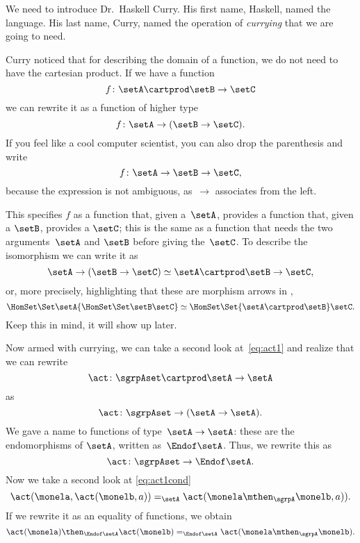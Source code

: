 We need to introduce Dr.~Haskell Curry. His first name,  Haskell, named the language.
 His last name, Curry, named the operation of \emph{currying} that we are going to need.

Curry noticed that for describing the domain of a function, we do not need to have the cartesian product.
If we have a function
\begin{equation}
f \colon \setA \cartprod \setB \to \setC
\end{equation}
we can rewrite it as a function of higher type
\begin{equation}
f \colon \setA \to ( \setB \to \setC).
\end{equation}
If you feel like a cool computer scientist, you can also drop the parenthesis and write
\begin{equation}
f \colon \setA \to \setB \to \setC,
\end{equation}
because the expression is not ambiguous, as~$\to$ associates from the left.



This specifies $f$ as a function that, given a~$\setA$, provides a function that, given a $\setB$,
provides a $\setC$; this is the same as a function that needs the two arguments~$\setA$ and $\setB$ before giving the~$\setC$.  To describe the isomorphism we can write it as 
\begin{equation}
  \setA \to ( \setB \to \setC) \simeq  \setA \cartprod \setB \to \setC,
\end{equation}
or, more precisely, highlighting that these are morphism arrows in \Set, 
\begin{equation}
  \HomSet\Set\setA{\HomSet\Set\setB\setC} \simeq \HomSet\Set{\setA \cartprod \setB}\setC.
\end{equation}
Keep this in mind, it will show up later.

Now armed with currying, we can take a second look at~\cref{eq:act1} and realize that we can rewrite 
\begin{equation}
\act \colon \sgrpAset \cartprod \setA \to \setA
\end{equation}
as 
\begin{equation}
  \act \colon \sgrpAset \to (\setA \to \setA).
\end{equation}
We gave a name to functions of type~$\setA \to \setA$: these are the endomorphisms of $\setA$, written as~$\Endof\setA$. Thus, we rewrite this as 
\begin{equation}\label{eq:act-to-endo}
  \act \colon \sgrpAset \to \Endof\setA.
\end{equation}
Now we take a second look at \cref{eq:act1cond}
\begin{equation} 
  \act(\monela, \act(\monelb, a)) =_{\setA} \act(\monela \mthen_\sgrpA \monelb, a)).
\end{equation}
If we rewrite it as an equality of functions, we obtain
\begin{equation} \label{eq:act-to-endo-properties}
  \act(\monela) \then_{\Endof\setA}  \act(\monelb) =_{\Endof\setA} \act(\monela \mthen_\sgrpA \monelb). 
\end{equation}

